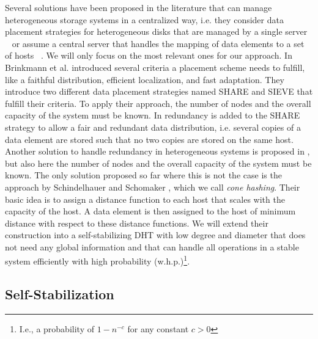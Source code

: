 \documentclass[11pt]{article}
\begin{document}
Several solutions have been proposed in the literature that can manage
heterogeneous storage systems in a centralized way, i.e. they consider data
placement strategies for heterogeneous disks that are managed by a single
server ~\cite{rio,slicing,spread,diskarray,broadscale,redShare} or assume a
central server that handles the mapping of data elements to a set of hosts
~\cite{cone,brink2,brink}. We will only focus on the most relevant ones for
our approach. In \cite{brink} Brinkmann et al. introduced several criteria a
placement scheme needs to fulfill, like a faithful distribution, efficient
localization, and fast adaptation. They introduce two different data placement
strategies named SHARE and SIEVE that fulfill their criteria. To apply their
approach, the number of nodes and the overall capacity of the system must be
known. In \cite{redShare} redundancy is added to the SHARE strategy to allow a
fair and redundant data distribution, i.e. several copies of a data element
are stored such that no two copies are stored on the same host. Another
solution to handle redundancy in heterogeneous systems is proposed in
\cite{spread}, but also here the number of nodes and the overall capacity of
the system must be known. The only solution proposed so far where this is not
the case is the approach by Schindelhauer and Schomaker \cite{cone}, which we
call {\em cone hashing}. Their basic idea is to assign a distance function to
each host that scales with the capacity of the host. A data element is then
assigned to the host of minimum distance with respect to these distance
functions. We will extend their construction into a self-stabilizing DHT with
low degree and diameter that does not need any global information and that can
handle all operations in a stable system efficiently with high probability
(w.h.p.)\footnote{ I.e., a probability of $1-n^{-c}$ for any constant $c>0$}.

\subsection{Self-Stabilization}
\end{document}
